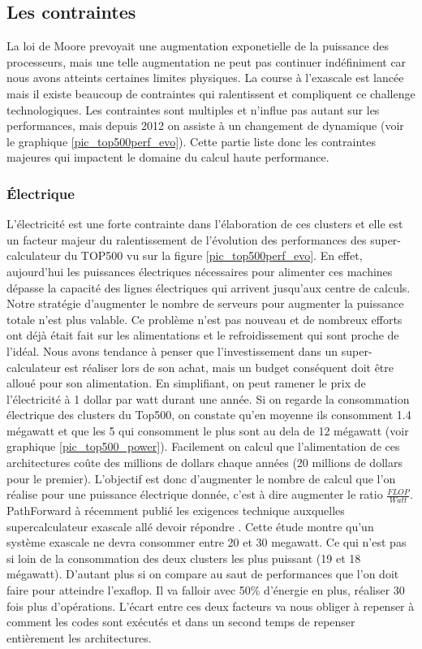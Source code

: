 
\subsection{Les contraintes}
La loi de Moore prevoyait une augmentation exponetielle de la puissance des processeurs, mais une telle augmentation ne peut pas continuer indéfiniment car nous avons atteints certaines limites physiques. La course à l'exascale est lancée mais il existe beaucoup de contraintes qui ralentissent et compliquent ce challenge technologiques. Les contraintes sont multiples et n'influe pas autant sur les performances, mais depuis 2012 on assiste à un changement de dynamique (voir le graphique \ref{pic_top500perf_evo}). Cette partie liste donc les contraintes majeures qui impactent le domaine du calcul haute performance.


\subsubsection{Électrique}
L'électricité est une forte contrainte dans l'élaboration de ces clusters et elle est un facteur majeur du ralentissement de l'évolution des performances des super-calculateur du TOP500 vu sur la figure \ref{pic_top500perf_evo}. En effet, aujourd'hui les puissances électriques nécessaires pour alimenter ces machines dépasse la capacité des lignes électriques qui arrivent jusqu'aux centre de calculs. Notre stratégie d'augmenter le nombre de serveurs pour augmenter la puissance totale n'est plus valable. Ce problème n'est pas nouveau et de nombreux efforts ont déjà était fait sur les alimentations et le refroidissement qui sont proche de l'idéal. Nous avons tendance à penser que l'investissement dans un super-calculateur est réaliser lors de son achat, mais un budget conséquent doit être alloué pour son alimentation. En simplifiant, on peut ramener le prix de l'électricité à 1 dollar par watt durant une année. Si on regarde la consommation électrique des clusters du Top500, on constate qu'en moyenne ils consomment 1.4 mégawatt et que les 5 qui consomment le plus sont au dela de 12 mégawatt (voir graphique \ref{pic_top500_power}). Facilement on calcul que l'alimentation de ces architectures coûte des millions de dollars chaque années (20 millions de dollars pour le premier).
L'objectif est donc d'augmenter le nombre de calcul que l'on réalise pour une puissance électrique donnée, c'est à dire augmenter le ratio $\frac{FLOP}{Watt}$. PathForward à récemment publié les exigences technique auxquelles supercalculateur exascale allé devoir répondre \cite{PathForward_Req}. Cette étude montre qu'un système exascale ne devra consommer entre 20 et 30 megawatt. Ce qui n'est pas si loin de la consommation des deux clusters les plus puissant (19 et 18 mégawatt). D'autant plus si on compare au saut de performances que l'on doit faire pour atteindre l'exaflop. Il va falloir avec 50\% d'énergie en plus, réaliser 30 fois plus d'opérations. L'écart entre ces deux facteurs va nous obliger à repenser à comment les codes sont exécutés et dans un second temps de repenser entièrement les architectures.


